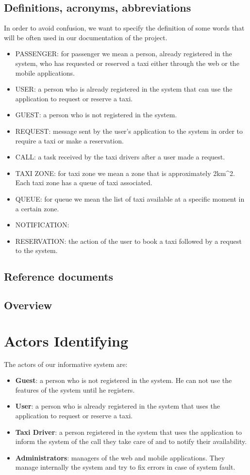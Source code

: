 \documentclass{article}
\begin{document}
	\subsection{Definitions, acronyms, abbreviations}
	In order to avoid confusion, we want to specify the definition of some words that will be often used in our documentation of the project. 
	\begin{itemize}
		\item PASSENGER: for passenger we mean a person, already registered in the system, who has requested or reserved a taxi either through the web or the mobile applications.
		\item USER: a person who is already registered in the system that can use the application to request or reserve a taxi.
		\item GUEST:  a person who is not registered in the system.
		\item REQUEST: message sent by the user's application to the system in order to require a taxi or make a reservation.
		\item CALL: a task received by the taxi drivers after a user made a request.
		\item TAXI ZONE: for taxi zone we mean a zone that is approximately 2km^2. Each taxi zone has a queue of taxi associated. 
	    \item QUEUE: for queue we mean the list of taxi available at a specific moment in a certain zone.
		\item NOTIFICATION: 
		\item RESERVATION: the action of the user to book a taxi followed by a request to the system.
	
	\end{itemize}

	
	\subsection{Reference documents}
	\subsection{Overview}
	
	
	\section{Actors Identifying}
	The actors of our informative system are:
	\begin{itemize}
	    \item \textbf{Guest}: a person who is not registered in the system. He can not use the features of the system until he registers. 
		\item \textbf{User}: a person who is already registered in the system that uses the application to request or reserve a taxi.
		\item \textbf{Taxi Driver}: a person registered in the system that uses the application to inform the system of the call they take care of and to notify their availability.
		\item \textbf{Administrators}: managers of the web and mobile applications. They manage internally the system and try to fix errors in case of system fault.
	\end{itemize}
	
\end{document}
